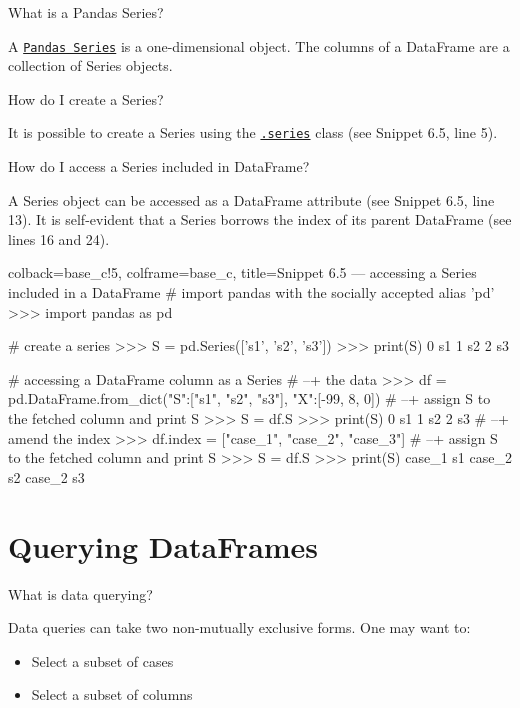 \documentclass[a4paper,11pt]{book}
\newcommand{\question}[1]{%
    \begin{tcolorbox}[colback=comp_c!10,colframe=comp_c,sidebyside align=top,width=\linewidth,before skip=1ex]
        #1
    \end{tcolorbox}
    \switchcolumn%
}
\newcommand{\note}[1]{%
    \begin{tcolorbox}[colback=white!0,colframe=white!10,width=\linewidth,before skip=1ex]
        #1
    \end{tcolorbox}
}
\begin{document}
\begin{paracol}{2}
	\question{\raggedright What is a Pandas Series?}
	\note{A \href{https://pandas.pydata.org/docs/reference/series.html}{\texttt{Pandas Series}} is a one-dimensional object. The columns of a DataFrame are a collection of Series objects.}
\end{paracol}

\begin{paracol}{2}
	\question{\raggedright How do I create a Series?}
	\note{It is possible to create a Series using the \href{https://pandas.pydata.org/docs/reference/series.html}{\texttt{.series}} class (see Snippet 6.5, line 5).}
\end{paracol}

\begin{paracol}{2}
	\question{\raggedright How do I access a Series included in DataFrame?}
	\note{A Series object can be accessed as a DataFrame attribute (see Snippet 6.5, line 13). It is self-evident that a Series borrows the index of its parent DataFrame (see lines 16 and 24).}
\end{paracol}

\begin{pythoncode}[linenos=True]{colback=base_c!5, colframe=base_c, title=\sffamily Snippet 6.5 --- accessing a Series included in a DataFrame}
# import pandas with the socially accepted alias 'pd'
>>> import pandas as pd

# create a series 
>>> S = pd.Series(['s1', 's2', 's3'])
>>> print(S)
0    s1
1    s2
2    s3

# accessing a DataFrame column as a Series
# --+ the data 
>>> df = pd.DataFrame.from_dict({"S":["s1", "s2", "s3"], "X":[-99, 8, 0]})
# --+ assign S to the fetched column and print S
>>> S = df.S
>>> print(S)
0    s1
1    s2
2    s3
# --+ amend the index
>>> df.index = ["case_1", "case_2", "case_3"]
# --+ assign S to the fetched column and print S
>>> S = df.S
>>> print(S)
case_1    s1
case_2    s2
case_2    s3
\end{pythoncode}
\clearpage

\section{Querying DataFrames}
\label{sec:querying_df}

\begin{paracol}{2}
	\question{\raggedright What is data querying?}
	\note{Data queries can take two non-mutually exclusive forms. One may want to:
	
	\begin{itemize}
		\item Select a subset of cases 
		\item Select a subset of columns
	\end{itemize}
	}
\end{paracol}
\end{document}
